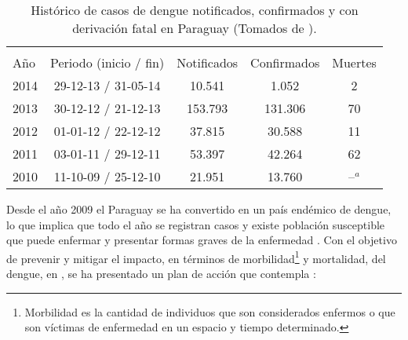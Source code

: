 \begin{table}
    \begin{minipage}{\textwidth}
        \begin{center}
        \caption{\label{tab:cap3-historico-casos-dengue} Histórico de casos de dengue notificados, confirmados y con derivación fatal en Paraguay (Tomados de \citep{website:mspbsHistoria2014}).}
        \begin{tabular}{p{3cm} c c c c}
            \hline\\
            Año & Periodo (inicio / fin) & Notificados & Confirmados & Muertes\\
            \hline
            \hline
            2014 & 29-12-13 / 31-05-14 & 10.541 & 1.052 & 2\\
            2013 & 30-12-12 / 21-12-13 & 153.793 & 131.306 & 70\\
            2012 & 01-01-12 / 22-12-12 & 37.815 & 30.588 & 11\\
            2011 & 03-01-11 / 29-12-11 & 53.397 & 42.264 & 62\\
            2010 & 11-10-09 / 25-12-10 & 21.951 & 13.760 & --$^a$\\
        \end{tabular}
        \end{center}
    \end{minipage}
\end{table}


Desde el año 2009 el Paraguay se ha convertido en un país endémico de dengue, lo que implica que
todo el año se registran casos y existe población susceptible que puede enfermar y presentar
formas graves de la enfermedad \cite{planControlMspbs2014}. Con el objetivo de prevenir y mitigar
el impacto, en términos de morbilidad\footnote{Morbilidad es la cantidad de individuos que son
considerados enfermos o que son víctimas de enfermedad en un espacio y tiempo determinado.} y
mortalidad, del dengue, en \cite{planControlMspbs2014}, se ha presentado un plan de acción que
contempla :

